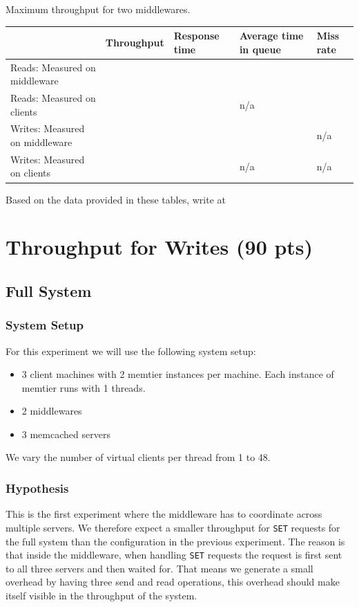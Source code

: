 \documentclass[11pt,a4paper]{article}
\begin{document}
\begin{center}
	{Maximum throughput for two middlewares.}
	\begin{tabular}{|l|p{2cm}|p{2cm}|p{2cm}|p{2cm}|}
		\hline                                & Throughput & Response time & Average time in queue & Miss rate \\ 
		\hline Reads: Measured on middleware  &            &               &                       &           \\ 
		\hline Reads: Measured on clients     &            &               & n/a                   &           \\ 
		\hline Writes: Measured on middleware &            &               &                       & n/a       \\ 
		\hline Writes: Measured on clients    &            &               & n/a                   & n/a       \\ 
		\hline 
	\end{tabular}
\end{center}

Based on the data provided in these tables, write at 

\section{Throughput for Writes (90 pts)}
%
\subsection{Full System}
%
\subsubsection{System Setup}
%
For this experiment we will use the following system setup:
%
\begin{itemize}
	\item 3 client machines with 2 memtier instances per machine. Each instance of memtier runs with 1 threads.
	\item 2 middlewares
	\item 3 memcached servers
\end{itemize}
%
We vary the number of virtual clients per thread from 1 to 48.
%
\subsubsection{Hypothesis}
%
This is the first experiment where the middleware has to coordinate across multiple servers.
%
We therefore expect a smaller throughput for \texttt{SET} requests for the full system than the configuration in the previous experiment.
%
The reason is that inside the middleware, when handling \texttt{SET} requests the request is first sent to all three servers and then waited for.
%
That means we generate a small overhead by having three send and read operations, this overhead should make itself visible in the throughput of the system.
%
\end{document}

